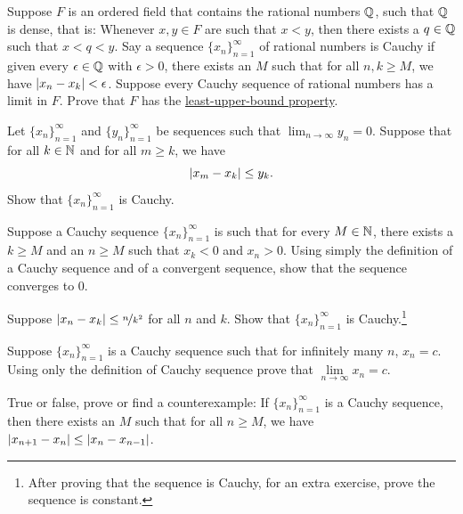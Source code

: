 \begin{exercise}[Challenging]
Suppose $F$ is an ordered field that contains the rational numbers
${\mathbb{Q}}$, such that ${\mathbb{Q}}$ is dense,
that is: Whenever $x,y \in F$ are such that $x < y$,
then there exists a $q \in {\mathbb{Q}}$ such that $x < q < y$.
Say a sequence $\{ x_n \}_{n=1}^\infty$ of rational numbers is Cauchy
if given every $\epsilon \in {\mathbb{Q}}$ with $\epsilon > 0$, there exists
an $M$ such that for all $n,k \geq M$, we have $\lvert {x_n-x_k} \rvert < \epsilon$.
Suppose every Cauchy sequence of rational numbers has a limit in $F$.
Prove that $F$ has the \hyperref[defn:lub]{least-upper-bound property}.
\end{exercise}

\begin{exercise}
Let $\{ x_n \}_{n=1}^\infty$ and $\{ y_n \}_{n=1}^\infty$ be sequences such
that $\lim_{n\to\infty} y_n =0$.  Suppose that for all $k \in {\mathbb{N}}$
and
for all $m \geq k$, we have
\begin{equation*}
\lvert {x_m-x_k} \rvert \leq y_k .
\end{equation*}
Show that $\{ x_n \}_{n=1}^\infty$ is Cauchy.
\end{exercise}

\begin{exercise}
Suppose a Cauchy sequence $\{ x_n \}_{n=1}^\infty$ is such that for every $M \in {\mathbb{N}}$,
there exists a $k \geq M$ and an $n \geq M$ such that
$x_k < 0$ and $x_n > 0$.  Using simply the definition of a Cauchy sequence
and of a convergent sequence, show that
the sequence converges to $0$.
\end{exercise}

\begin{exercise}
Suppose $\lvert {x_n-x_k} \rvert \leq \nicefrac{n}{k^2}$ for all $n$ and $k$.
Show that $\{ x_n \}_{n=1}^\infty$ is Cauchy.\footnote{After proving that
the sequence is Cauchy, for an extra exercise, prove the sequence is constant.}
\end{exercise}

\begin{exercise}
Suppose $\{ x_n \}_{n=1}^\infty$ is a Cauchy sequence such that for infinitely many
$n$, $x_n = c$.  Using only the definition of Cauchy sequence prove 
that $\lim\limits_{n\to\infty} x_n = c$.
\end{exercise}

\begin{exercise}
True or false, prove or find a counterexample:  If $\{ x_n \}_{n=1}^\infty$ is a Cauchy
sequence, then there exists an $M$
such that for all $n \geq M$, we have
$\lvert {x_{n+1}-x_n} \rvert
\leq
\lvert {x_{n}-x_{n-1}} \rvert$.
\end{exercise}

